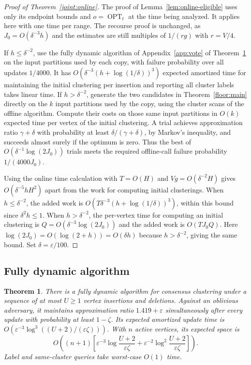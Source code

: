 \documentclass[11pt]{article}
\newtheorem{theorem}{Theorem}[section]
\newcommand{\OPT}{\operatorname{OPT}}
\begin{document}
\begin{proof}[Proof of Theorem~\ref{joint:online}]
The proof of Lemma~\ref{lem:online-eligible} uses only its endpoint
bounds and $o=\OPT_t$ at the time being analyzed. It applies here
with one time per range. The recourse proof is unchanged, as
$J_0=O(\delta^{-3}h)$ and the estimates are still multiples of $1/(rg)$ with
$r=V/4$.

If $h\le\delta^{-2}$, use the fully dynamic algorithm of Appendix~\ref{app:vote} of
Theorem~\ref{fastnew:main} on the input partitions used by each copy, with failure
probability over all updates $1/4000$. It has
$O(\delta^{-3}(h+\log(1/\delta))^3)$ expected amortized time for maintaining the initial
clustering per insertion and reporting all cluster labels takes linear time.
If $h>\delta^{-2}$, generate the two candidates in
Theorem~\ref{floor:main} directly on the $k$ input partitions used by the copy, using
the cluster scans of the offline algorithm. Compute their costs on those same
input partitions in $O(k)$ expected time per vertex of the initial clustering. A trial achieves
approximation ratio $\gamma+\delta$ with probability at least
$\delta/(\gamma+\delta)$, by Markov's inequality, and succeeds
almost surely if the optimum is zero. Thus the best of
$O(\delta^{-1}\log(2J_0))$ trials meets the required offline-call failure
probability $1/(4000J_0)$.

Using the online time calculation with $T=O(H)$ and
$Vg=O(\delta^{-2}H)$ gives $O(\delta^{-5}hH^2)$ apart from the
work for computing initial clusterings. When $h\le\delta^{-2}$, the added work is
$O(T\delta^{-3}(h+\log(1/\delta))^3)$, within this bound since
$\delta^2h\le1$. When $h>\delta^{-2}$, the per-vertex time for computing an initial clustering is
$Q=O(\delta^{-3}\log(2J_0))$ and the added work is $O(TJ_0Q)$.
Here $\log(2J_0)=O(\log(2+h))=O(\delta h)$ because
$h>\delta^{-2}$, giving the same bound. Set $\delta=\varepsilon/100$.
\end{proof}

\subsection{Fully dynamic algorithm}
\label{fastnew:section}

\begin{theorem}
\label{fastnew:main}
There is a fully dynamic algorithm for consensus clustering under a
sequence of at most $U\ge1$ vertex insertions and deletions.
Against an oblivious adversary, it maintains approximation ratio
$1.419+\varepsilon$ simultaneously after every update with probability
at least $1-\zeta$. Its expected amortized update time is
$O(\varepsilon^{-3}\log^3((U+2)/(\varepsilon\zeta)))$. With $n$ active
vertices, its expected space is
\[
 O\!\left((n+1)\left[
 \varepsilon^{-3}\log\frac{U+2}{\varepsilon\zeta}
 +\varepsilon^{-2}\log^2\frac{U+2}{\varepsilon\zeta}\right]\right).
\]
Label and same-cluster queries take worst-case $O(1)$ time.
\end{theorem}
\end{document}
